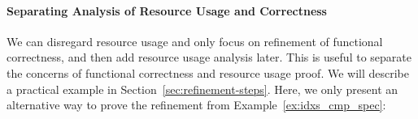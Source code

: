 \documentclass[acmsmall]{acmart}
\newcommand{\is}{\lstinline[language=isabelle]}
\begin{document}








\paragraph{Separating Analysis of Resource Usage and Correctness} \label{sec:split}

We can disregard resource usage and only focus on refinement of functional correctness, and then add resource usage analysis later. This is useful to separate the concerns of functional correctness and resource usage proof.
We will describe a practical example in Section~\ref{sec:refinement-steps}. Here, we 
only present an alternative way to prove the refinement from Example~\ref{ex:idxs_cmp_spec}:
\end{document}
